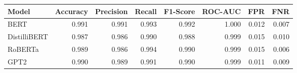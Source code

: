 \begin{tabular}{|l||r|r|r|r|r|r|r|}
\toprule
Model & \textbf{Accuracy} & \textbf{Precision} & Recall & \textbf{F1-Score} & \textbf{ROC-AUC} & \textbf{FPR} & FNR \\
\midrule \midrule
BERT & 0.991 & 0.991 & 0.993 & 0.992 & 1.000 & 0.012 & 0.007 \\
DistilliBERT & 0.987 & 0.986 & 0.990 & 0.988 & 0.999 & 0.015 & 0.010 \\
RoBERTa & 0.989 & 0.986 & 0.994 & 0.990 & 0.999 & 0.015 & 0.006 \\
GPT2 & 0.990 & 0.989 & 0.991 & 0.990 & 0.999 & 0.011 & 0.009 \\
\bottomrule
\end{tabular}
